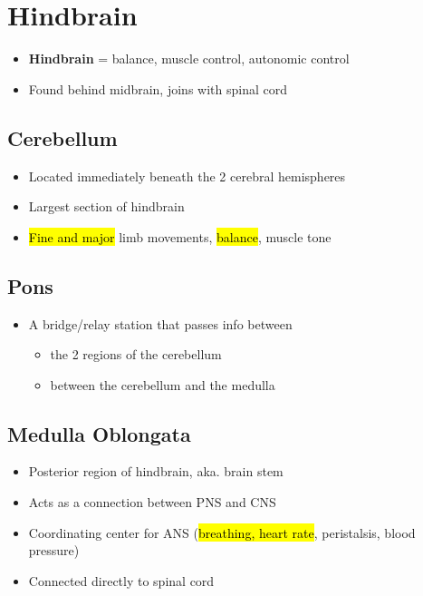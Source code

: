 \documentclass[a4paper,12pt]{article}
\begin{document}
\section{Hindbrain}
\begin{itemize}
    \item{\textbf{Hindbrain} = balance, muscle control, autonomic control}
    \item{Found behind midbrain, joins with spinal cord}
\end{itemize}

\subsection{Cerebellum}
\begin{itemize}
    \item{Located immediately beneath the 2 cerebral hemispheres}
    \item{Largest section of hindbrain}
    \item{\hl{Fine and major} limb movements, \hl{balance}, muscle tone}
\end{itemize}

\subsection{Pons}
\begin{itemize}
    \item{
            A bridge/relay station that passes info between
            \begin{itemize}
                \item{the 2 regions of the cerebellum}
                \item{between the cerebellum and the medulla}
            \end{itemize}
        }
\end{itemize}

\subsection{Medulla Oblongata}
\begin{itemize}
    \item{Posterior region of hindbrain, aka. brain stem}
    \item{Acts as a connection between PNS and CNS}
    \item{Coordinating center for ANS (\hl{breathing, heart rate}, peristalsis, blood pressure)}
    \item{Connected directly to spinal cord}
\end{itemize}
\end{document}
